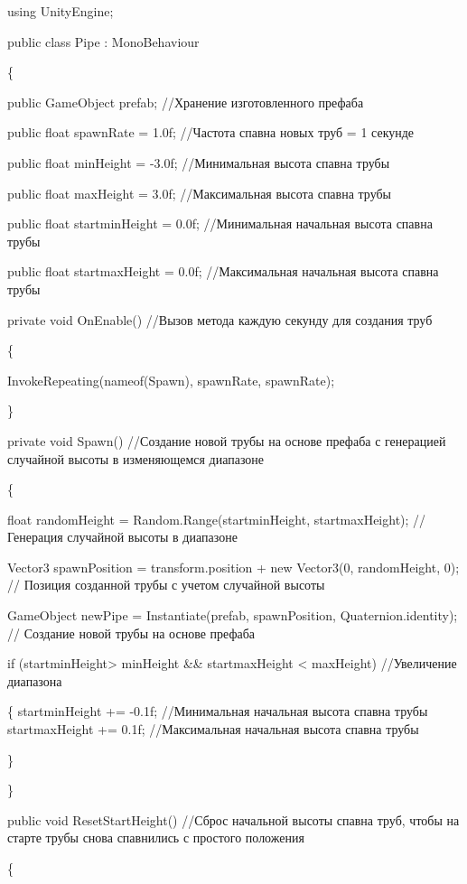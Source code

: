 \documentclass[14pt, oneside]{altsu-report}
\begin{document}
using UnityEngine;

public class Pipe : MonoBehaviour

\{

    public GameObject prefab; //Хранение изготовленного префаба

    public float spawnRate = 1.0f; //Частота спавна новых труб = 1 секунде

    public float minHeight = -3.0f; //Минимальная высота спавна трубы
    
    public float maxHeight = 3.0f; //Максимальная высота спавна трубы

    public float startminHeight = 0.0f; //Минимальная начальная высота спавна трубы
    
    public float startmaxHeight = 0.0f; //Максимальная начальная высота спавна трубы

    private void OnEnable() //Вызов метода каждую секунду для создания труб 
    
    \{
        
        InvokeRepeating(nameof(Spawn), spawnRate, spawnRate);
    
    \}

    private void Spawn() //Создание новой трубы на основе префаба с генерацией случайной высоты в изменяющемся диапазоне
    
    \{
    
        float randomHeight = Random.Range(startminHeight, startmaxHeight); // Генерация случайной высоты в диапазоне

        Vector3 spawnPosition = transform.position + new Vector3(0, randomHeight, 0); // Позиция созданной трубы с учетом случайной высоты

        GameObject newPipe = Instantiate(prefab, spawnPosition, Quaternion.identity); // Создание новой трубы на основе префаба

        if (startminHeight> minHeight \&\& startmaxHeight < maxHeight) //Увеличение диапазона

        \{
            startminHeight += -0.1f; //Минимальная начальная высота спавна трубы
            startmaxHeight += 0.1f; //Максимальная начальная высота спавна трубы

        \}
        
    \}

    public void ResetStartHeight() //Сброс начальной высоты спавна труб, чтобы на старте трубы снова спавнились с простого положения
    
    \{
    
\end{document}
